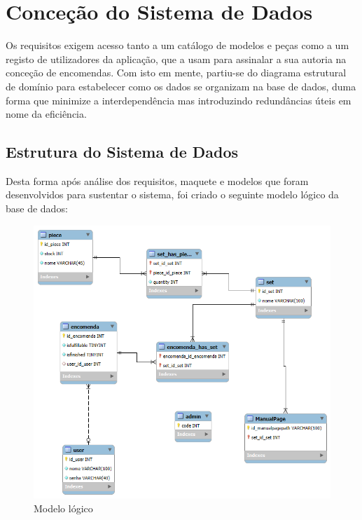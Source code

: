 
\chapter{Conceção do Sistema de Dados}
    Os requisitos exigem acesso tanto a um catálogo de modelos e peças como a um registo de utilizadores da aplicação, que a usam para assinalar a sua autoria na conceção de encomendas. Com isto em mente, partiu-se do diagrama estrutural de domínio para estabelecer como os dados se organizam na base de dados, duma forma que minimize a interdependência mas introduzindo redundâncias úteis em nome da eficiência.
    
    \section{Estrutura do Sistema de Dados}
        Desta forma após análise dos requisitos, maquete e modelos que foram desenvolvidos para sustentar o sistema, foi criado o seguinte modelo lógico da base de dados:
        \begin{figure}
            \centering
            \includegraphics[width=\textwidth]{images/modelologico.png}
            \caption{Modelo lógico}
            \label{fig:modelologico}
        \end{figure}

